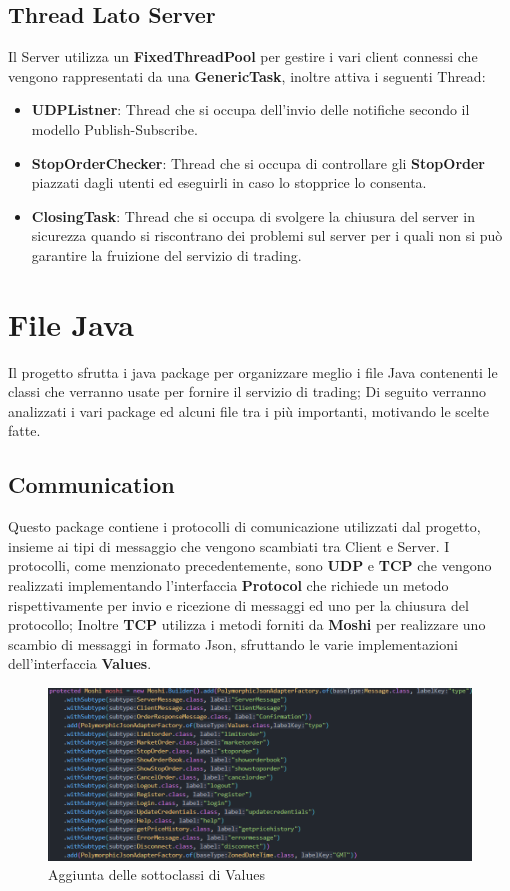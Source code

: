 \documentclass{article}
\begin{document}
\subsection{Thread Lato Server}
Il Server utilizza un \textbf{FixedThreadPool} per gestire i vari client connessi che vengono rappresentati da una \textbf{GenericTask}, inoltre attiva i seguenti Thread:
\begin{itemize}
  \item \textbf{UDPListner}: Thread che si occupa dell'invio delle notifiche secondo il modello Publish-Subscribe.
  \item \textbf{StopOrderChecker}: Thread che si occupa di controllare gli \textbf{StopOrder} piazzati dagli utenti ed eseguirli in caso lo stopprice lo consenta.
  \item \textbf{ClosingTask}: Thread che si occupa di svolgere la chiusura del server in sicurezza quando si riscontrano dei problemi sul server per i quali non si può garantire la fruizione del servizio di trading.
\end{itemize}

\newpage

\section{File Java}
Il progetto sfrutta i java package per organizzare meglio i file Java contenenti le classi che verranno usate per fornire il servizio di trading; Di seguito verranno analizzati i vari package ed alcuni file tra i più importanti, motivando le scelte fatte.
\subsection{Communication}
Questo package contiene i protocolli di comunicazione utilizzati dal progetto, insieme ai tipi di messaggio che vengono scambiati tra Client e Server.
I protocolli, come menzionato precedentemente, sono \textbf{UDP} e \textbf{TCP} che vengono realizzati implementando l'interfaccia \textbf{Protocol} che richiede un metodo rispettivamente per invio e ricezione di messaggi ed uno per la chiusura del protocollo;
Inoltre \textbf{TCP} utilizza i metodi forniti da \textbf{Moshi} per realizzare uno scambio di messaggi in formato Json, sfruttando le varie implementazioni dell'interfaccia \textbf{Values}.

\begin{figure} %
  \centering
  \includegraphics[width=\linewidth]{Moshi-Classi.png} %
  \caption{\footnotesize Aggiunta delle sottoclassi di Values}
\end{figure}
\end{document}

